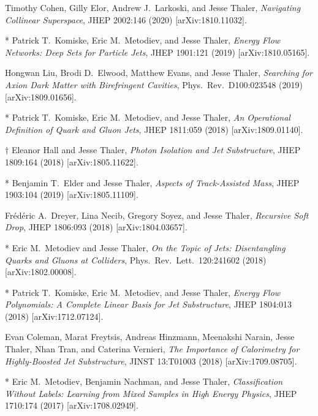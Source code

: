 \begin{list}{[]\addtocounter{jessecount}{-1}}{\leftmargin=3em \itemsep=4pt}
\item
 Timothy Cohen, Gilly Elor, Andrew J.\ Larkoski, and Jesse Thaler,
\emph{Navigating Collinear Superspace},
JHEP 2002:146 (2020)
[arXiv:1810.11032].

\item
* Patrick T.\ Komiske, Eric M.\ Metodiev, and Jesse Thaler,
\emph{Energy Flow Networks: Deep Sets for Particle Jets},
JHEP 1901:121 (2019)
[arXiv:1810.05165].

\item
 Hongwan Liu, Brodi D.\ Elwood, Matthew Evans, and Jesse Thaler,
\emph{Searching for Axion Dark Matter with Birefringent Cavities},
Phys.\ Rev.\ D100:023548 (2019)
[arXiv:1809.01656].

\item
* Patrick T.\ Komiske, Eric M.\ Metodiev, and Jesse Thaler,
\emph{An Operational Definition of Quark and Gluon Jets},
JHEP 1811:059 (2018)
[arXiv:1809.01140].

\item
$\dagger$ Eleanor Hall and Jesse Thaler,
\emph{Photon Isolation and Jet Substructure},
JHEP 1809:164 (2018)
[arXiv:1805.11622].

\item
* Benjamin T.\ Elder and Jesse Thaler,
\emph{Aspects of Track-Assisted Mass},
JHEP 1903:104 (2019)
[arXiv:1805.11109].

\item
 Frédéric A.\ Dreyer, Lina Necib, Gregory Soyez, and Jesse Thaler,
\emph{Recursive Soft Drop},
JHEP 1806:093 (2018)
[arXiv:1804.03657].

\item
* Eric M.\ Metodiev and Jesse Thaler,
\emph{On the Topic of Jets: Disentangling Quarks and Gluons at Colliders},
Phys.\ Rev.\ Lett.\ 120:241602 (2018)
[arXiv:1802.00008].

\item
* Patrick T.\ Komiske, Eric M.\ Metodiev, and Jesse Thaler,
\emph{Energy Flow Polynomials: A Complete Linear Basis for Jet Substructure},
JHEP 1804:013 (2018)
[arXiv:1712.07124].

\item
 Evan Coleman, Marat Freytsis, Andreas Hinzmann, Meenakshi Narain, Jesse Thaler, Nhan Tran, and Caterina Vernieri,
\emph{The Importance of Calorimetry for Highly-Boosted Jet Substructure},
JINST 13:T01003 (2018)
[arXiv:1709.08705].

\item
* Eric M.\ Metodiev, Benjamin Nachman, and Jesse Thaler,
\emph{Classification Without Labels: Learning from Mixed Samples in High Energy Physics},
JHEP 1710:174 (2017)
[arXiv:1708.02949].


\end{list}
